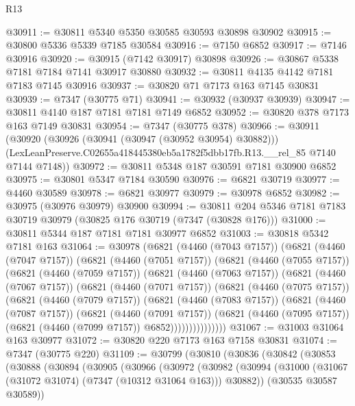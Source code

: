 \begin{lexlean}{R13}
\begin{coremodule}
@30911 := @30811 @5340 @5350 @30585 @30593 @30898 @30902
@30915 := @30800 @5336 @5339 @7185 @30584
@30916 := @7150 @6852
@30917 := @7146 @30916
@30920 := @30915 (@7142 @30917) @30898
@30926 := @30867 @5338 @7181 @7184 @7141 @30917 @30880
@30932 := @30811 @4135 @4142 @7181 @7183 @7145 @30916
@30937 := @30820 @71 @7173 @163 @7145 @30831
@30939 := @7347 (@30775 @71)
@30941 := @30932 (@30937 @30939)
@30947 := @30811 @4140 @187 @7181 @7181 @7149 @6852
@30952 := @30820 @378 @7173 @163 @7149 @30831
@30954 := @7347 (@30775 @378)
@30966 := @30911
    (@30920
      (@30926 (@30941 (@30947 (@30952 @30954) @30882)))
      (LexLeanPreserve.C02655a418445380eb5a1782f5dbb17fb.R13.__rel_85 @7140 @7144 @7148))
@30972 := @30811 @5348 @187 @30591 @7181 @30900 @6852
@30975 := @30801 @5347 @7184 @30590
@30976 := @6821 @30719
@30977 := @4460 @30589
@30978 := @6821 @30977
@30979 := @30978 @6852
@30982 := @30975 (@30976 @30979) @30900
@30994 := @30811 @204 @5346 @7181 @7183 @30719 @30979 (@30825 @176 @30719 (@7347 (@30828 @176)))
@31000 := @30811 @5344 @187 @7181 @7181 @30977 @6852
@31003 := @30818 @5342 @7181 @163
@31064 := @30978
    (@6821
      (@4460 (@7043 @7157))
      (@6821
        (@4460 (@7047 @7157))
        (@6821
          (@4460 (@7051 @7157))
          (@6821
            (@4460 (@7055 @7157))
            (@6821
              (@4460 (@7059 @7157))
              (@6821
                (@4460 (@7063 @7157))
                (@6821
                  (@4460 (@7067 @7157))
                  (@6821
                    (@4460 (@7071 @7157))
                    (@6821
                      (@4460 (@7075 @7157))
                      (@6821
                        (@4460 (@7079 @7157))
                        (@6821
                          (@4460 (@7083 @7157))
                          (@6821
                            (@4460 (@7087 @7157))
                            (@6821
                              (@4460 (@7091 @7157))
                              (@6821
                                (@4460 (@7095 @7157))
                                (@6821 (@4460 (@7099 @7157)) @6852)))))))))))))))
@31067 := @31003 @31064 @163 @30977
@31072 := @30820 @220 @7173 @163 @7158 @30831
@31074 := @7347 (@30775 @220)
@31109 := @30799
    (@30810
      (@30836
        (@30842
          (@30853
            (@30888
              (@30894
                (@30905
                  (@30966
                    (@30972
                      (@30982
                        (@30994
                          (@31000 (@31067 (@31072 @31074) (@7347 (@10312 @31064 @163))) @30882))
                        (@30535 @30587 @30589))

\end{coremodule}
\end{lexlean}
